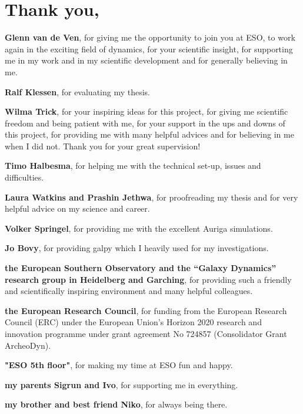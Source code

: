 \section*{Thank you,}

\textbf{Glenn van de Ven}, for giving me the opportunity to join you at ESO, to work again in the exciting field of dynamics, for your scientific insight, for supporting me in my work and in my scientific development and for generally believing in me. 

\textbf{Ralf Klessen}, for evaluating my thesis.

\textbf{Wilma Trick}, for your inspiring ideas for this project, for giving me scientific freedom and being patient with me, for your support in the ups and downs of this project, for providing me with many helpful advices and for believing in me when I did not. Thank you for your great supervision!

\textbf{Timo Halbesma}, for helping me with the technical set-up, issues and difficulties. 

\textbf{Laura Watkins and Prashin Jethwa}, for proofreading my thesis and for very helpful advice on my science and career.

\textbf{Volker Springel}, for providing me with the excellent Auriga simulations.

\textbf{Jo Bovy}, for providing galpy which I heavily used for my investigations.

\textbf{the European Southern Observatory and the “Galaxy Dynamics” research group in Heidelberg and Garching}, for providing such a friendly and scientifically inspiring environment and many helpful colleagues.

\textbf{the European Research Council}, for funding from the European Research Council (ERC) under the European Union's Horizon 2020 research and innovation programme under grant agreement No 724857 (Consolidator Grant ArcheoDyn).

\textbf{"ESO 5th floor"}, for making my time at ESO fun and happy.

\textbf{my parents Sigrun and Ivo}, for supporting me in everything.

\textbf{my brother and best friend Niko}, for always being there.